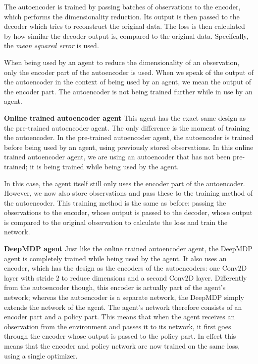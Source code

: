 The autoencoder is trained by passing batches of observations to the encoder, which performs the dimensionality reduction. Its output is then passed to the decoder which tries to reconstruct the original data. The loss is then calculated by how similar the decoder output is, compared to the original data. Specifcally, the \emph{mean squared error} is used.

When being used by an agent to reduce the dimensionality of an observation, only the encoder part of the autoencoder is used. When we speak of the output of the autoencoder in the context of being used by an agent, we mean the output of the encoder part. The autoencoder is not being trained further while in use by an agent. \newline
 
\noindent \textbf{Online trained autoencoder agent}\newline
\noindent  This agent has the exact same design as the pre-trained autoencoder agent. The only difference is the moment of training the autoencoder. In the pre-trained autoencoder agent, the autoencoder is trained before being used by an agent, using previously stored observations. In this online trained autoencoder agent, we are using an autoencoder that has not been pre-trained; it is being trained while being used by the agent. 

In this case, the agent itself still only uses the encoder part of the autoencoder. However, we now also store observations and pass these to the training method of the autoencoder. This training method is the same as before: passing the observations to the encoder, whose output is passed to the decoder, whose output is compared to the original observation to calculate the loss and train the network.\newline

\noindent \textbf{DeepMDP agent}\newline
\noindent Just like the online trained autoencoder agent, the DeepMDP agent is completely trained while being used by the agent. It also uses an encoder, which has the design as the encoders of the autoencoders: one Conv2D layer with stride $2$ to reduce dimensions and a second Conv2D layer. Differently from the autoencoder though, this encoder is actually part of the agent's network; whereas the autoencoder is a separate network, the DeepMDP simply extends the network of the agent. The agent's network therefore consists of an encoder part and a policy part. This means that when the agent receives an observation from the environment and passes it to its network, it first goes through the encoder whose output is passed to the policy part. In effect this means that the encoder and policy network are now trained on the same loss, using a single optimizer.

